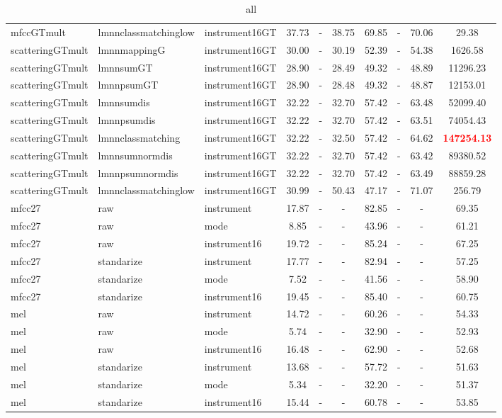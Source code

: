 \begin{table}
\begin{center}
\begin{tabular}{lllccccccc}
mfccGTmult & lmnnclassmatchinglow & instrument16GT & 37.73 &   - & 38.75 & 69.85 &   - & 70.06 &     29.38 \\ 
scatteringGTmult & lmnnmappingG & instrument16GT & 30.00 &   - & 30.19 & 52.39 &   - & 54.38 &   1626.58 \\ 
scatteringGTmult & lmnnsumGT & instrument16GT & 28.90 &   - & 28.49 & 49.32 &   - & 48.89 &  11296.23 \\ 
scatteringGTmult & lmnnpsumGT & instrument16GT & 28.90 &   - & 28.48 & 49.32 &   - & 48.87 &  12153.01 \\ 
scatteringGTmult & lmnnsumdis & instrument16GT & 32.22 &   - & 32.70 & 57.42 &   - & 63.48 &  52099.40 \\ 
scatteringGTmult & lmnnpsumdis & instrument16GT & 32.22 &   - & 32.70 & 57.42 &   - & 63.51 &  74054.43 \\ 
scatteringGTmult & lmnnclassmatching & instrument16GT & 32.22 &   - & 32.50 & 57.42 &   - & 64.62 & \textbf{\textcolor{red}{147254.13}} \\ 
scatteringGTmult & lmnnsumnormdis & instrument16GT & 32.22 &   - & 32.70 & 57.42 &   - & 63.42 &  89380.52 \\ 
scatteringGTmult & lmnnpsumnormdis & instrument16GT & 32.22 &   - & 32.70 & 57.42 &   - & 63.49 &  88859.28 \\ 
scatteringGTmult & lmnnclassmatchinglow & instrument16GT & 30.99 &   - & 50.43 & 47.17 &   - & 71.07 &    256.79 \\ 
mfcc27 & raw & instrument & 17.87 &   - &   - & 82.85 &   - &   - &     69.35 \\ 
mfcc27 & raw & mode &  8.85 &   - &   - & 43.96 &   - &   - &     61.21 \\ 
mfcc27 & raw & instrument16 & 19.72 &   - &   - & 85.24 &   - &   - &     67.25 \\ 
mfcc27 & standarize & instrument & 17.77 &   - &   - & 82.94 &   - &   - &     57.25 \\ 
mfcc27 & standarize & mode &  7.52 &   - &   - & 41.56 &   - &   - &     58.90 \\ 
mfcc27 & standarize & instrument16 & 19.45 &   - &   - & 85.40 &   - &   - &     60.75 \\ 
mel & raw & instrument & 14.72 &   - &   - & 60.26 &   - &   - &     54.33 \\ 
mel & raw & mode &  5.74 &   - &   - & 32.90 &   - &   - &     52.93 \\ 
mel & raw & instrument16 & 16.48 &   - &   - & 62.90 &   - &   - &     52.68 \\ 
mel & standarize & instrument & 13.68 &   - &   - & 57.72 &   - &   - &     51.63 \\ 
mel & standarize & mode &  5.34 &   - &   - & 32.20 &   - &   - &     51.37 \\ 
mel & standarize & instrument16 & 15.44 &   - &   - & 60.78 &   - &   - &     53.85 \\ 
\end{tabular} 
\end{center} 
\caption{all} 
\label{you} 
\end{table} 
 

